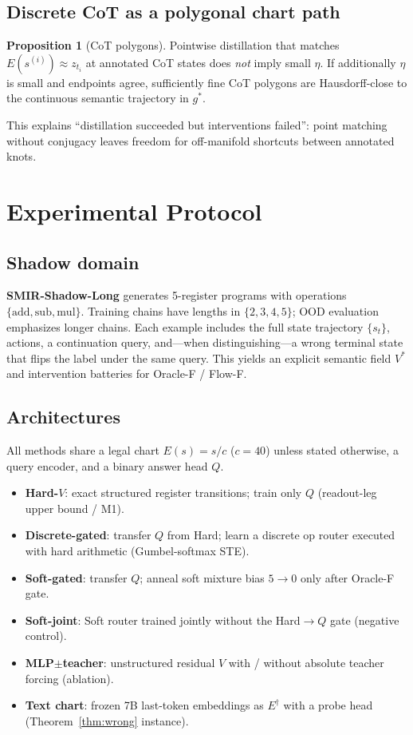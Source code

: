 \documentclass[letterpaper,10pt,twocolumn]{article}
\theoremstyle{definition}
\newtheorem{proposition}{Proposition}
\begin{document}
\subsection{Discrete CoT as a polygonal chart path}
\begin{proposition}[CoT polygons]
\label{prop:cot}
Pointwise distillation that matches $E(s^{(i)})\approx z_{t_i}$ at annotated CoT states does \emph{not} imply small $\eta$.
If additionally $\eta$ is small and endpoints agree, sufficiently fine CoT polygons are Hausdorff-close to the continuous semantic trajectory in $g^*$.
\end{proposition}
This explains ``distillation succeeded but interventions failed'': point matching without conjugacy leaves freedom for off-manifold shortcuts between annotated knots.

\section{Experimental Protocol}
\label{sec:method}

\subsection{Shadow domain}
\textbf{SMIR-Shadow-Long} generates 5-register programs with operations $\{\mathrm{add},\mathrm{sub},\mathrm{mul}\}$.
Training chains have lengths in $\{2,3,4,5\}$; OOD evaluation emphasizes longer chains.
Each example includes the full state trajectory $\{s_t\}$, actions, a continuation query, and---when distinguishing---a wrong terminal state that flips the label under the same query.
This yields an explicit semantic field $V^*$ and intervention batteries for Oracle-F / Flow-F.

\subsection{Architectures}
All methods share a legal chart $E(s)=s/c$ ($c{=}40$) unless stated otherwise, a query encoder, and a binary answer head $Q$.
\begin{itemize}[leftmargin=*]
\item \textbf{Hard-$V$}: exact structured register transitions; train only $Q$ (readout-leg upper bound / M1).
\item \textbf{Discrete-gated}: transfer $Q$ from Hard; learn a discrete op router executed with hard arithmetic (Gumbel-softmax STE).
\item \textbf{Soft-gated}: transfer $Q$; anneal soft mixture bias $5\!\to\!0$ only after Oracle-F gate.
\item \textbf{Soft-joint}: Soft router trained jointly without the Hard$\to Q$ gate (negative control).
\item \textbf{MLP$\pm$teacher}: unstructured residual $V$ with / without absolute teacher forcing (ablation).
\item \textbf{Text chart}: frozen 7B last-token embeddings as $E^\dagger$ with a probe head (Theorem~\ref{thm:wrong} instance).
\end{itemize}
\end{document}
